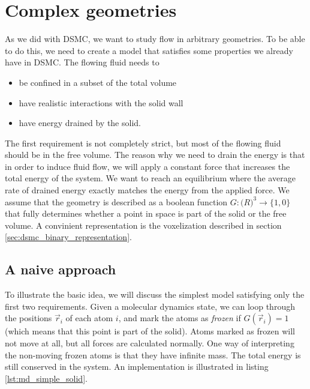 \section{Complex geometries}
As we did with DSMC, we want to study flow in arbitrary geometries.  To be able to do this, we need to create a model that satisfies some properties we already have in DSMC. The flowing fluid needs to
\begin{itemize}
	\item be confined in a subset of the total volume
	\item have realistic interactions with the solid wall
	\item have energy drained by the solid.
\end{itemize}
The first requirement is not completely strict, but most of the flowing fluid should be in the free volume. The reason why we need to drain the energy is that in order to induce fluid flow, we will apply a constant force that increases the total energy of the system. We want to reach an equilibrium where the average rate of drained energy exactly matches the energy from the applied force. We assume that the geometry is described as a boolean function $G : \mathcal(R)^3\rightarrow \{1,0\}$ that fully determines whether a point in space is part of the solid or the free volume. A convinient representation is the voxelization described in section \ref{sec:dsmc_binary_representation}. 
\subsection{A naive approach}
To illustrate the basic idea, we will discuss the simplest model satisfying only the first two requirements. Given a molecular dynamics state, we can loop through the positions $\vec r_i$ of each atom $i$, and mark the atoms as \textit{frozen} if $G(\vec r_i) = 1$ (which means that this point is part of the solid). Atoms marked as frozen will not move at all, but all forces are calculated normally. One way of interpreting the non-moving frozen atoms is that they have infinite mass. The total energy is still conserved in the system. An implementation is illustrated in listing \ref{lst:md_simple_solid}.

